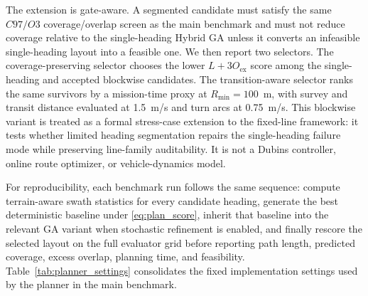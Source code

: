 \documentclass[jmse,article,submit,moreauthors]{Definitions/mdpi}
\begin{document}
The extension is gate-aware. A segmented candidate must satisfy the same \(C97/O3\) coverage/overlap screen as the main benchmark and must not reduce coverage relative to the single-heading Hybrid GA unless it converts an infeasible single-heading layout into a feasible one. We then report two selectors. The coverage-preserving selector chooses the lower \(L+3O_{\mathrm{ex}}\) score among the single-heading and accepted blockwise candidates. The transition-aware selector ranks the same survivors by a mission-time proxy at \(R_{\min}=100\)~m, with survey and transit distance evaluated at 1.5~m/s and turn arcs at 0.75~m/s. This blockwise variant is treated as a formal stress-case extension to the fixed-line framework: it tests whether limited heading segmentation repairs the single-heading failure mode while preserving line-family auditability. It is not a Dubins controller, online route optimizer, or vehicle-dynamics model.

For reproducibility, each benchmark run follows the same sequence: compute terrain-aware swath statistics for every candidate heading, generate the best deterministic baseline under \eqref{eq:plan_score}, inherit that baseline into the relevant GA variant when stochastic refinement is enabled, and finally rescore the selected layout on the full evaluator grid before reporting path length, predicted coverage, excess overlap, planning time, and feasibility. Table~\ref{tab:planner_settings} consolidates the fixed implementation settings used by the planner in the main benchmark.
\end{document}
